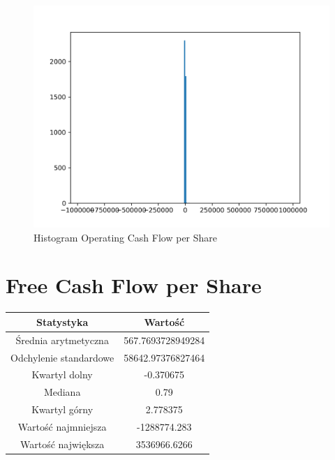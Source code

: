\documentclass{article}
\begin{document}
\begin{figure}[h!]
    \includegraphics[width=\linewidth]{variables/Operating Cash Flow per Share.png}
    \caption{Histogram Operating Cash Flow per Share }
\end{figure}\section{ Free Cash Flow per Share }

\begin{center}
    \begin{tabular}{|c | c|} 
    \hline
    Statystyka & Wartość \\
    \hline\hline
    Średnia arytmetyczna & 567.7693728949284 \\ 
    \hline
    Odchylenie standardowe & 58642.97376827464 \\
    \hline
    Kwartyl dolny & -0.370675 \\
    \hline
    Mediana & 0.79 \\
    \hline
    Kwartyl górny & 2.778375 \\
    \hline
    Wartość najmniejsza & -1288774.283 \\
    \hline
    Wartość największa & 3536966.6266 \\
    \hline
   \end{tabular}
\end{center}
\end{document}
